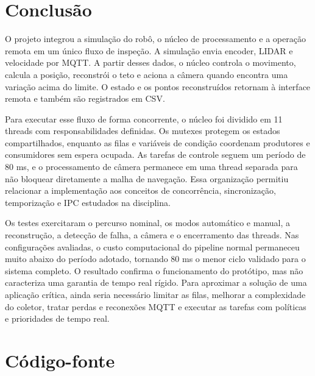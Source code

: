 \documentclass[12pt,a4paper]{article}
\begin{document}
\begin{center}
\end{center}

\clearpage
\section{Conclusão}

O projeto integrou a simulação do robô, o núcleo de processamento e a operação remota em um único fluxo de inspeção. A simulação envia encoder, LIDAR e velocidade por MQTT. A partir desses dados, o núcleo controla o movimento, calcula a posição, reconstrói o teto e aciona a câmera quando encontra uma variação acima do limite. O estado e os pontos reconstruídos retornam à interface remota e também são registrados em CSV.

Para executar esse fluxo de forma concorrente, o núcleo foi dividido em 11 threads com responsabilidades definidas. Os mutexes protegem os estados compartilhados, enquanto as filas e variáveis de condição coordenam produtores e consumidores sem espera ocupada. As tarefas de controle seguem um período de 80 ms, e o processamento de câmera permanece em uma thread separada para não bloquear diretamente a malha de navegação. Essa organização permitiu relacionar a implementação aos conceitos de concorrência, sincronização, temporização e IPC estudados na disciplina.

Os testes exercitaram o percurso nominal, os modos automático e manual, a reconstrução, a detecção de falha, a câmera e o encerramento das threads. Nas configurações avaliadas, o custo computacional do pipeline normal permaneceu muito abaixo do período adotado, tornando 80 ms o menor ciclo validado para o sistema completo. O resultado confirma o funcionamento do protótipo, mas não caracteriza uma garantia de tempo real rígido. Para aproximar a solução de uma aplicação crítica, ainda seria necessário limitar as filas, melhorar a complexidade do coletor, tratar perdas e reconexões MQTT e executar as tarefas com políticas e prioridades de tempo real.

\clearpage
\appendix
\section{Código-fonte}
\end{document}
